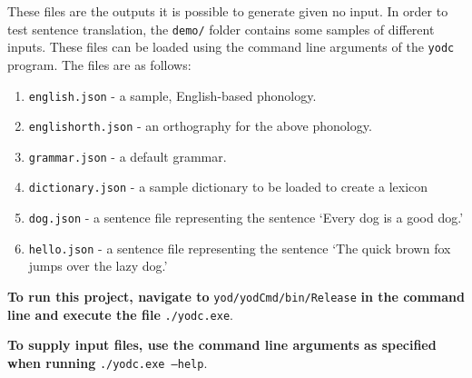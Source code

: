 \documentclass{report}
\begin{document}
	These files are the outputs it is possible to generate given no input. In order to test sentence translation, the \texttt{demo/} folder contains some samples of different inputs. These files can be loaded using the command line arguments of the \texttt{yodc} program. The files are as follows:
	\begin{enumerate}
		\item \texttt{english.json} - a sample, English-based phonology.
		\item \texttt{englishorth.json} - an orthography for the above phonology.
		\item \texttt{grammar.json} - a default grammar.
		\item \texttt{dictionary.json} - a sample dictionary to be loaded to create a lexicon
		\item \texttt{dog.json} - a sentence file representing the sentence `Every dog is a good dog.'
		\item \texttt{hello.json} - a sentence file representing the sentence `The quick brown fox jumps over the lazy dog.'
	\end{enumerate}
	
	\textbf{To run this project, navigate to} \texttt{yod/yodCmd/bin/Release} \textbf{in the command line and execute the file} \texttt{./yodc.exe}.
	
	\textbf{To supply input files, use the command line arguments as specified when running} \texttt{./yodc.exe --help}.
	
	
\end{document}
